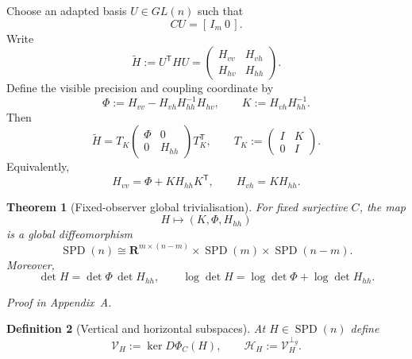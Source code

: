\documentclass[11pt,a4paper]{article}
\numberwithin{equation}{section}
\DeclareMathOperator{\SPD}{SPD}
\newcommand{\R}{\mathbf R}
\theoremstyle{thmcompact}
\newtheorem{theorem}{Theorem}[section]
\newtheorem{definition}[theorem]{Definition}
\theoremstyle{remark}
\newcommand{\proofappendix}{\par{\hfill\scriptsize\emph{Proof in Appendix~A.}}\par}
\begin{document}
Choose an adapted basis $U\in GL(n)$ such that
\begin{equation}
CU=[\,I_m\ 0\,].
\label{eq:adapted-basis}
\end{equation}
Write
\begin{equation}
\widetilde H:=U^{\mathsf T}HU=
\begin{pmatrix}
H_{vv} & H_{vh}\\
H_{hv} & H_{hh}
\end{pmatrix}.
\label{eq:block-H}
\end{equation}
Define the visible precision and coupling coordinate by
\begin{equation}
\Phi:=H_{vv}-H_{vh}H_{hh}^{-1}H_{hv},
\qquad
K:=H_{vh}H_{hh}^{-1}.
\label{eq:Phi-K-def}
\end{equation}
Then
\begin{equation}
\widetilde H = T_K
\begin{pmatrix}
\Phi & 0\\
0 & H_{hh}
\end{pmatrix}
T_K^{\mathsf T},
\qquad
T_K:=
\begin{pmatrix}
I & K\\
0 & I
\end{pmatrix}.
\label{eq:H-factorisation}
\end{equation}
Equivalently,
\begin{equation}
H_{vv}=\Phi+K H_{hh}K^{\mathsf T},
\qquad
H_{vh}=K H_{hh}.
\label{eq:reconstruction-blocks}
\end{equation}

\begin{theorem}[Fixed-observer global trivialisation]
\label{thm:global-trivialisation}
For fixed surjective $C$, the map
\begin{equation}
H\mapsto (K,\Phi,H_{hh})
\label{eq:coord-map}
\end{equation}
is a global diffeomorphism
\begin{equation}
\SPD(n)\cong \R^{m\times(n-m)}\times\SPD(m)\times\SPD(n-m).
\label{eq:global-diffeo}
\end{equation}
Moreover,
\begin{equation}
\det H = \det\Phi\,\det H_{hh},
\qquad
\log\det H = \log\det\Phi + \log\det H_{hh}.
\label{eq:det-split}
\end{equation}
\end{theorem}

\proofappendix

\begin{definition}[Vertical and horizontal subspaces]
\label{def:vert-horiz}
At $H\in\SPD(n)$ define
\begin{equation}
\mathcal V_H:=\ker D\Phi_C(H),
\qquad
\mathcal H_H:=\mathcal V_H^{\perp_g}.
\label{eq:vert-horiz}
\end{equation}
\end{definition}
\end{document}
